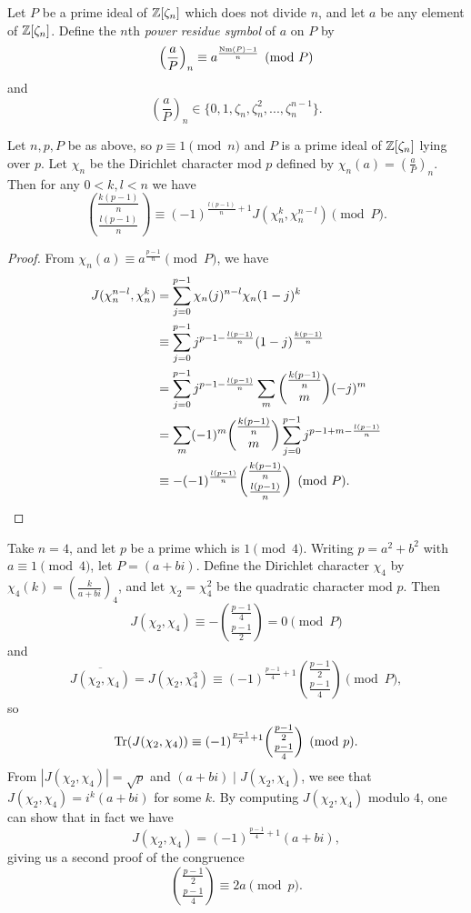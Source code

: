 \begin{defn} Let $P$ be a prime ideal of $\mathbb{Z}[\zeta_n]$ which does not divide $n$, and let $a$ be any element of $\mathbb{Z}[\zeta_n]$. Define the $n$th \emph{power residue symbol} of $a$ on $P$ by
\[
\left(\frac{a}{P}\right)_n \equiv a^{\frac{\operatorname{Nm}(P)-1}{n}} \pmod{P}
\]
and
\[
\left(\frac{a}{P}\right)_n \in \{0, 1, \zeta_n, \zeta_n^2, ..., \zeta_n^{n-1}\}.
\]
\end{defn}

\begin{thm} Let $n,p,P$ be as above, so $p \equiv 1 \pmod{n}$ and $P$ is a prime ideal of $\mathbb{Z}[\zeta_n]$ lying over $p$. Let $\chi_n$ be the Dirichlet character mod $p$ defined by $\chi_n(a) = (\frac{a}{P})_n$. Then for any $0 < k,l < n$ we have
\[
\binom{\frac{k(p-1)}{n}}{\frac{l(p-1)}{n}} \equiv (-1)^{\frac{l(p-1)}{n}+1}J(\chi_n^k,\chi_n^{n-l}) \pmod{P}.
\]
\end{thm}
\begin{proof} From $\chi_n(a) \equiv a^{\frac{p-1}{n}} \pmod{P}$, we have
\begin{align*}
J(\chi_n^{n-l},\chi_n^k) &= \sum_{j=0}^{p-1} \chi_n(j)^{n-l}\chi_n(1-j)^k\\
&\equiv \sum_{j=0}^{p-1} j^{p-1-\frac{l(p-1)}{n}}(1-j)^{\frac{k(p-1)}{n}}\\
&= \sum_{j=0}^{p-1} j^{p-1-\frac{l(p-1)}{n}} \sum_m \binom{\frac{k(p-1)}{n}}{m}(-j)^m\\
&= \sum_m (-1)^m\binom{\frac{k(p-1)}{n}}{m} \sum_{j=0}^{p-1} j^{p-1+m-\frac{l(p-1)}{n}}\\
&\equiv -(-1)^{\frac{l(p-1)}{n}}\binom{\frac{k(p-1)}{n}}{\frac{l(p-1)}{n}}\pmod{P}.\qedhere
\end{align*}
\end{proof}

\begin{ex} Take $n = 4$, and let $p$ be a prime which is $1 \pmod{4}$. Writing $p = a^2+b^2$ with $a \equiv 1 \pmod{4}$, let $P = (a+bi)$. Define the Dirichlet character $\chi_4$ by $\chi_4(k) = (\frac{k}{a+bi})_4$, and let $\chi_2 = \chi_4^2$ be the quadratic character mod $p$. Then
\[
J(\chi_2,\chi_4) \equiv -\binom{\frac{p-1}{4}}{\frac{p-1}{2}} = 0 \pmod{P}
\]
and
\[
\overline{J(\chi_2,\chi_4)} = J(\chi_2,\chi_4^3) \equiv (-1)^{\frac{p-1}{4}+1}\binom{\frac{p-1}{2}}{\frac{p-1}{4}} \pmod{P},
\]
so
\[
\operatorname{Tr}(J(\chi_2,\chi_4)) \equiv (-1)^{\frac{p-1}{4}+1}\binom{\frac{p-1}{2}}{\frac{p-1}{4}} \pmod{p}.
\]
From $|J(\chi_2,\chi_4)| = \sqrt{p}$ and $(a+bi) \mid J(\chi_2,\chi_4)$, we see that $J(\chi_2,\chi_4) = i^k(a+bi)$ for some $k$. By computing $J(\chi_2,\chi_4)$ modulo $4$, one can show that in fact we have
\[
J(\chi_2,\chi_4) = (-1)^{\frac{p-1}{4}+1}(a+bi),
\]
giving us a second proof of the congruence
\[
\binom{\frac{p-1}{2}}{\frac{p-1}{4}} \equiv 2a \pmod{p}.
\]
\end{ex}

